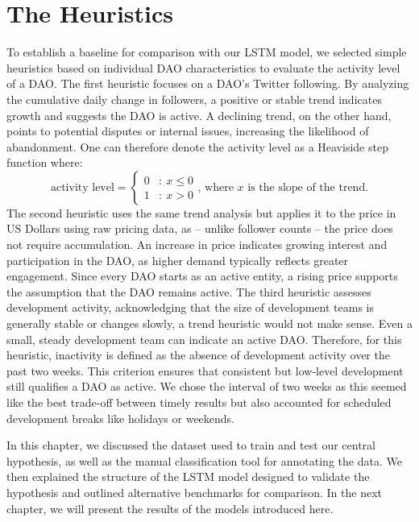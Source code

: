 \section{The Heuristics}
To establish a baseline for comparison with our LSTM model, we selected simple heuristics based on individual DAO characteristics to evaluate the activity level of a DAO.
The first heuristic focuses on a DAO's Twitter following. By analyzing the cumulative daily change in followers, a positive or stable trend indicates growth and suggests the DAO is active. A declining trend, on the other hand, points to potential disputes or internal issues, increasing the likelihood of abandonment. One can therefore denote the activity level as a Heaviside step function where:
 \[
    {\text{activity level} = \left\{ \begin{array}{cl}
    0 & : \ x \leq 0 \\
    1 & : \ x > 0
    \end{array} \right.}
    \text{, where } x \text{ is the slope of the trend.}
\]
The second heuristic uses the same trend analysis but applies it to the price in US Dollars using raw pricing data, as -- unlike follower counts -- the price does not require accumulation. An increase in price indicates growing interest and participation in the DAO, as higher demand typically reflects greater engagement. Since every DAO starts as an active entity, a rising price supports the assumption that the DAO remains active.
The third heuristic assesses development activity, acknowledging that the size of development teams is generally stable or changes slowly, a trend heuristic would not make sense. Even a small, steady development team can indicate an active DAO. Therefore, for this heuristic, inactivity is defined as the absence of development activity over the past two weeks. This criterion ensures that consistent but low-level development still qualifies a DAO as active. We chose the interval of two weeks as this seemed like the best trade-off between timely results but also accounted for scheduled development breaks like holidays or weekends.

In this chapter, we discussed the dataset used to train and test our central hypothesis, as well as the manual classification tool for annotating the data. We then explained the structure of the LSTM model designed to validate the hypothesis and outlined alternative benchmarks for comparison. In the next chapter, we will present the results of the models introduced here.